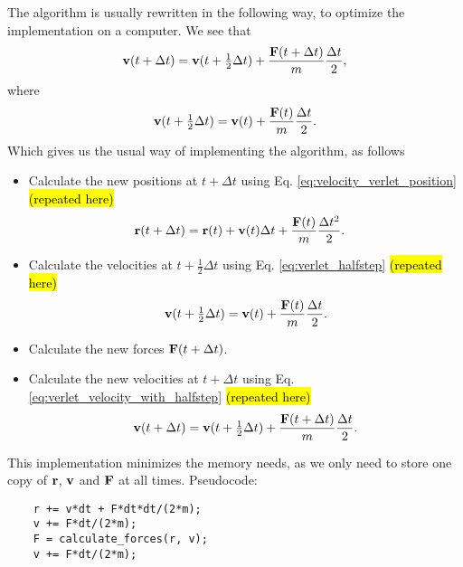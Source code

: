 The algorithm is usually rewritten in the following way, to optimize the implementation on a computer. We see that
\begin{align}
    \mathbf{v}(t+\Delta t) = \mathbf{v}(t + \tfrac{1}{2}\Delta t) + \frac{\mathbf{F}(t + \Delta t)}{m}\frac{\Delta t}{2},\label{eq:verlet_velocity_with_halfstep}
\end{align}
where
\begin{align}
    \mathbf{v}(t + \tfrac{1}{2}\Delta t) = \mathbf{v}(t) + \frac{\mathbf{F}(t)}{m}\frac{\Delta t}{2}.\label{eq:verlet_halfstep}
\end{align}
 Which gives us the usual way of implementing the algorithm\cite{allen1989computer}, as follows
\begin{itemize}
    \item Calculate the new positions at $t + \Delta t$ using Eq. \eqref{eq:velocity_verlet_position} \hl{(repeated here)}
    \begin{align*}
        \mathbf{r}(t + \Delta t) &= \mathbf{r}(t) + \mathbf{v}(t)\Delta t + \frac{\mathbf{F}(t)}{m}\frac{\Delta t^2}{2}.
    \end{align*}
    \item Calculate the velocities at $t+\tfrac{1}{2}\Delta t$ using Eq. \eqref{eq:verlet_halfstep} \hl{(repeated here)}
    \begin{align*}
        \mathbf{v}(t + \tfrac{1}{2}\Delta t) = \mathbf{v}(t) + \frac{\mathbf{F}(t)}{m}\frac{\Delta t}{2}.
    \end{align*}
    \item Calculate the new forces $\mathbf{F}(t+\Delta t)$.
    \item Calculate the new velocities at $t+\Delta t$ using Eq. \eqref{eq:verlet_velocity_with_halfstep} \hl{(repeated here)}
    \begin{align*}
        \mathbf{v}(t+\Delta t) = \mathbf{v}(t + \tfrac{1}{2}\Delta t) + \frac{\mathbf{F}(t + \Delta t)}{m}\frac{\Delta t}{2}.
    \end{align*}
\end{itemize}
This implementation minimizes the memory needs, as we only need to store one copy of $\mathbf{r}$, $\mathbf{v}$ and $\mathbf{F}$ at all times. Pseudocode: 
\begin{verbatim}
    r += v*dt + F*dt*dt/(2*m);
    v += F*dt/(2*m);
    F = calculate_forces(r, v);
    v += F*dt/(2*m);
\end{verbatim}


